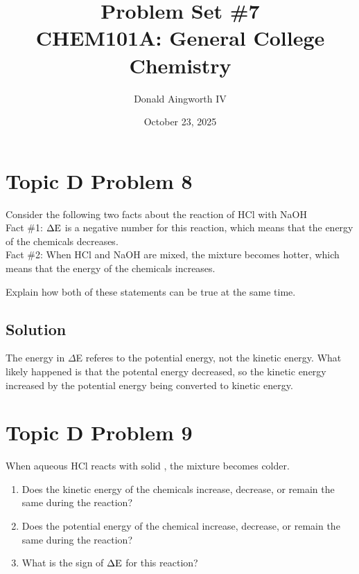 \documentclass[10pt]{article}
\title{
    Problem Set \#7
    \\  \small
    CHEM101A: General College Chemistry
    }
\author{Donald Aingworth IV}
\date{October 23, 2025}
\begin{document}

    \maketitle

    \setcounter{section}{7}

    \pagebreak
    \section{Topic D Problem 8}
        Consider the following two facts about the reaction of HCl with NaOH\\
        Fact \#1: $\rm \Delta E$ is a negative number for this reaction, which means that the energy of the chemicals decreases.\\        
        Fact \#2: When HCl and NaOH are mixed, the mixture becomes hotter, which means that the energy of the chemicals increases.
        
        Explain how both of these statements can be true at the same time.

        \subsection{Solution}
            The energy in $\Delta$E referes to the potential energy, not the kinetic energy.
            What likely happened is that the potental energy decreased, so the kinetic energy increased by the potential energy being converted to kinetic energy.

    \pagebreak
    \section{Topic D Problem 9}
        When aqueous HCl reacts with solid , the mixture becomes colder.
        \begin{enumerate}[label=\alph*)]
            \item   Does the kinetic energy of the chemicals increase, decrease, or remain the same during the reaction?
            \item   Does the potential energy of the chemical increase, decrease, or remain the same during the reaction?
            \item   What is the sign of $\rm \Delta E$ for this reaction?
        \end{enumerate}
        
\end{document}
